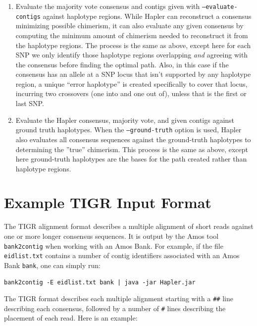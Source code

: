 \documentclass[11pt]{llncs}
\begin{document}
\begin{enumerate}
\item Evaluate the majority vote consensus and contigs given with \texttt{--evaluate-contigs} against haplotype regions. 
While Hapler can reconstruct a consensus minimizing 
possible chimerism, it can also evaluate any given consensus by computing the minimum amount of chimerism needed to reconstruct it from the haplotype
regions. The process is the same as above, except here for each SNP we only identify those haplotype regions overlapping \emph{and} agreeing with the
consensus before finding the optimal path. Also, in this case if the consensus has an allele at a SNP locus that isn't supported by any haplotype region,
a unique ``error haplotype'' is created specifically to cover that locus, incurring two crossovers (one into and one out of), unless that is the first or
last SNP.

\item Evaluate the Hapler consensus, majority vote, and given contigs against ground truth haplotypes. When the \texttt{--ground-truth}
option is used, Hapler also evaluates all consensus sequences against the ground-truth haplotypes to determining the ''true'' chimerism. 
This process is the same as above, except here ground-truth haplotypes are the bases for the path created rather than haplotype regions. 


\end{enumerate}



\appendix

\newpage
\section{Example TIGR Input Format}
\label{exampleTigrInputFormat}

The TIGR alignment format describes a multiple alignment of short reads against one or more longer consensus sequences. It is output by the Amos
tool \texttt{bank2contig} when working with an Amos Bank. 
For example, if the file \texttt{eidlist.txt} contains a number of contig identifiers
associated with an Amos Bank \texttt{bank}, one can simply run:

\begin{verbatim}
bank2contig -E eidlist.txt bank | java -jar Hapler.jar
\end{verbatim}

The TIGR format describes each multiple alignment starting with a \verb=##= line describing each consensus, followed by a number of \verb=#=
lines describing the placement of each read. Here is an example:
\end{document}
